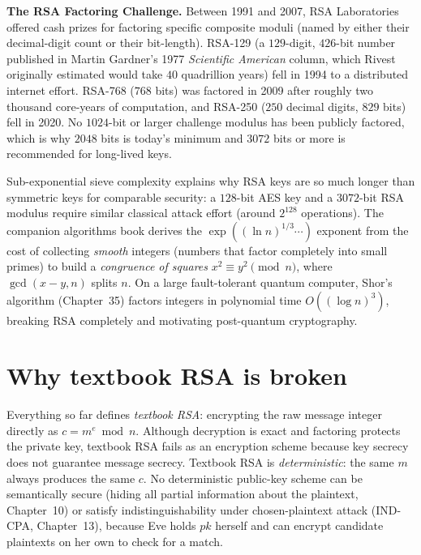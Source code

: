\begin{applicationbox}
\textbf{The RSA Factoring Challenge.} Between 1991 and 2007, RSA Laboratories offered cash prizes for factoring specific composite moduli (named by either their decimal-digit count or their bit-length). RSA-129 (a $129$-digit, $426$-bit number published in Martin Gardner's 1977 \emph{Scientific American} column, which Rivest originally estimated would take $40$ quadrillion years) fell in 1994 to a distributed internet effort. RSA-768 ($768$ bits) was factored in 2009 after roughly two thousand core-years of computation, and RSA-250 ($250$ decimal digits, $829$ bits) fell in 2020. No $1024$-bit or larger challenge modulus has been publicly factored, which is why $2048$ bits is today's minimum and $3072$ bits or more is recommended for long-lived keys.
\end{applicationbox}

\begin{connectionbox}
Sub-exponential sieve complexity explains why RSA keys are so much longer than symmetric keys for comparable security: a $128$-bit AES key and a $3072$-bit RSA modulus require similar classical attack effort (around $2^{128}$ operations). The companion algorithms book derives the $\exp((\ln n)^{1/3}\cdots)$ exponent from the cost of collecting \emph{smooth} integers (numbers that factor completely into small primes) to build a \emph{congruence of squares} $x^2 \equiv y^2 \pmod n$, where $\gcd(x-y, n)$ splits $n$. On a large fault-tolerant quantum computer, Shor's algorithm (Chapter~35) factors integers in polynomial time $O((\log n)^3)$, breaking RSA completely and motivating post-quantum cryptography.
\end{connectionbox}

\section{Why textbook RSA is broken}
\label{ch19:textbook-broken}

Everything so far defines \emph{textbook RSA}: encrypting the raw message integer directly as $c=m^e\bmod n$. Although decryption is exact and factoring protects the private key, textbook RSA fails as an encryption scheme because key secrecy does not guarantee message secrecy. Textbook RSA is \emph{deterministic}: the same $m$ always produces the same $c$. No deterministic public-key scheme can be semantically secure (hiding all partial information about the plaintext, Chapter~10) or satisfy indistinguishability under chosen-plaintext attack (IND-CPA, Chapter~13), because Eve holds $pk$ herself and can encrypt candidate plaintexts on her own to check for a match.

